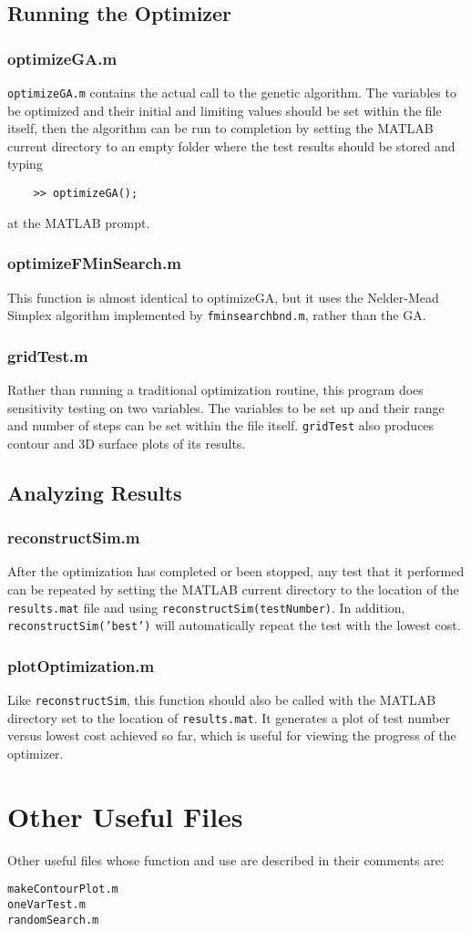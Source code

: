 \documentclass[]{article}
\begin{document}
\subsection{Running the Optimizer}
\subsubsection{optimizeGA.m}
\texttt{optimizeGA.m} contains the actual call to the genetic algorithm. The variables to be optimized and their initial and limiting values should be set within the file itself, then the algorithm can be run to completion by setting the MATLAB current directory to an empty folder where the test results should be stored and typing
\begin{verbatim}
	>> optimizeGA();
\end{verbatim}
at the MATLAB prompt. 
\subsubsection{optimizeFMinSearch.m}
This function is almost identical to optimizeGA, but it uses the Nelder-Mead Simplex algorithm implemented by \texttt{fminsearchbnd.m}, rather than the GA.
\subsubsection{gridTest.m}
Rather than running a traditional optimization routine, this program does sensitivity testing on two variables. The variables to be set up and their range and number of steps can be set within the file itself. \texttt{gridTest} also produces contour and 3D surface plots of its results.
\subsection{Analyzing Results}
\subsubsection{reconstructSim.m}
After the optimization has completed or been stopped, any test that it performed can be repeated by setting the MATLAB current directory to the location of the \texttt{results.mat} file and using \texttt{reconstructSim(testNumber)}. In addition, \texttt{reconstructSim('best')} will automatically repeat the test with the lowest cost. 
\subsubsection{plotOptimization.m}
Like \texttt{reconstructSim}, this function should also be called with the MATLAB directory set to the location of \texttt{results.mat}. It generates a plot of test number versus lowest cost achieved so far, which is useful for viewing the progress of the optimizer. 
\section{Other Useful Files}
Other useful files whose function and use are described in their comments are:
\begin{verbatim}
makeContourPlot.m
oneVarTest.m
randomSearch.m
\end{verbatim}
\end{document}
